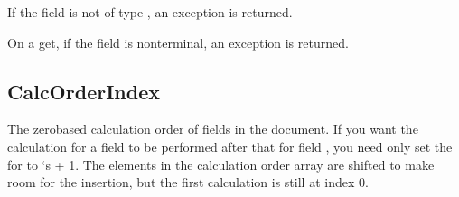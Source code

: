 \documentclass[letterpaper,12pt,english,openany,oneside]{sphinxmanual}
\begin{document}
If the field is not of type , an exception  is returned.

On a get, if the field is non\sphinxhyphen{}terminal, an exception  is returned.

\label{\detokenize{IAC_API_FormsIntro:example-9}}

\begin{sphinxVerbatim}[commandchars=\\\{\}]
  
\end{sphinxVerbatim}




\subsection{CalcOrderIndex}
\label{\detokenize{IAC_API_FormsIntro:calcorderindex}}
The zero\sphinxhyphen{}based calculation order of fields in the document. If you want the calculation for a field  to be performed after that for field , you need only set the  for  to  ‘s  + 1. The elements in the calculation order array are shifted to make room for the insertion, but the first calculation is still at index 0.

\label{\detokenize{IAC_API_FormsIntro:syntax-14}}

\begin{sphinxVerbatim}[commandchars=\\\{\}]
\PYG{p}{[}\PYG{p}{]} 
\end{sphinxVerbatim}
\label{\detokenize{IAC_API_FormsIntro:example-10}}

\begin{sphinxVerbatim}[commandchars=\\\{\}]
   
   
    
\end{sphinxVerbatim}
\end{document}
